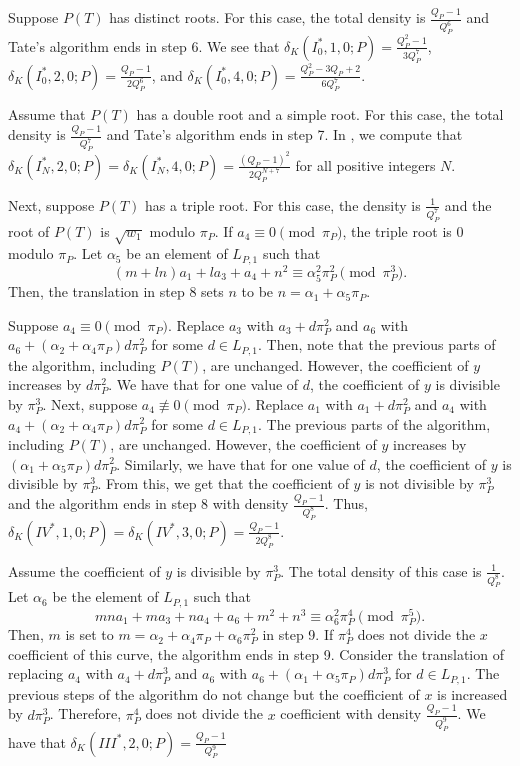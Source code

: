 \documentclass[12pt,letterpaper]{amsart}
\theoremstyle{definition}
\begin{document}
Suppose $P(T)$ has distinct roots. For this case, the total density is $\frac{Q_P-1}{Q_P^6}$ and Tate's algorithm ends in step 6. We see that $\delta_K(I_0^*,1,0;P)=\frac{Q_P^2-1}{3Q_P^7}$, $\delta_K(I_0^*,2,0;P)=\frac{Q_P-1}{2Q_P^6}$, and $\delta_K(I_0^*,4,0;P)=\frac{Q_P^2-3Q_P+2}{6Q_P^7}$.

Assume that $P(T)$ has a double root and a simple root. For this case, the total density is $\frac{Q_P-1}{Q_P^7}$ and Tate's algorithm ends in step 7. In , we compute that $\delta_K(I_N^*, 2,0 ;P)=\delta_K(I_N^*,4,0;P)=\frac{(Q_P-1)^2}{2Q_P^{N+7}}$ for all positive integers $N$.

Next, suppose $P(T)$ has a triple root. For this case, the density is $\frac{1}{Q_P^7}$ and the root of $P(T)$ is $\sqrt{w_1}$ modulo $\pi_P$. If $a_4\equiv 0\pmod{\pi_P}$, the triple root is $0$ modulo $\pi_P$. Let $\alpha_5$ be an element of $L_{P,1}$ such that
\[(m+ln)a_1 + la_3+a_4+n^2\equiv\alpha_5^2\pi_P^2\pmod{\pi_P^3}.
\]
Then, the translation in step 8 sets $n$ to be $n=\alpha_1+\alpha_5\pi_P$.

Suppose $a_4\equiv 0\pmod{\pi_P}$. Replace $a_3$ with $a_3+d\pi_P^2$ and $a_6$ with $a_6+(\alpha_2+\alpha_4\pi_P) d\pi_P^2$ for some $d\in L_{P,1}$. Then, note that the previous parts of the algorithm, including $P(T)$, are unchanged. However, the coefficient of $y$ increases by $d\pi_P^2$. We have that for one value of $d$, the coefficient of $y$ is divisible by $\pi_P^3$. Next, suppose $a_4\not\equiv 0\pmod{\pi_P}$. Replace $a_1$ with $a_1+d\pi_P^2$ and $a_4$ with $a_4+(\alpha_2+\alpha_4\pi_P)d\pi_P^2$ for some $d\in L_{P,1}$. The previous parts of the algorithm, including $P(T)$, are unchanged. However, the coefficient of $y$ increases by $(\alpha_1+\alpha_5\pi_P)d\pi_P^2$. Similarly, we have that for one value of $d$, the coefficient of $y$ is divisible by $\pi_P^3$. From this, we get that the coefficient of $y$ is not divisible by $\pi_P^3$ and the algorithm ends in step 8 with density $\frac{Q_P-1}{Q_P^8}$. Thus, $\delta_K(IV^*,1,0;P)=\delta_K(IV^*,3,0;P)=\frac{Q_P-1}{2Q_P^8}$.

Assume the coefficient of $y$ is divisible by $\pi_P^3$. The total density of this case is $\frac{1}{Q_P^8}$. Let $\alpha_6$ be the element of $L_{P,1}$ such that
\[
mna_1+ma_3+na_4+a_6+m^2+n^3\equiv\alpha_6^2\pi_P^4\pmod{\pi_P^5}.
\]
Then, $m$ is set to $m=\alpha_2+\alpha_4\pi_P+\alpha_6\pi_P^2$ in step 9. If $\pi_P^4$ does not divide the $x$ coefficient of this curve, the algorithm ends in step 9. Consider the translation of replacing $a_4$ with $a_4+d\pi_P^3$ and $a_6$ with $a_6+(\alpha_1+\alpha_5\pi_P)d\pi_P^3$ for $d\in L_{P,1}$. The previous steps of the algorithm do not change but the coefficient of $x$ is increased by $d\pi_P^3$. Therefore, $\pi_P^4$ does not divide the $x$ coefficient with density $\frac{Q_P-1}{Q_P^9}$. We have that $\delta_K(III^*,2,0;P)=\frac{Q_P-1}{Q_P^9}$
\end{document}
